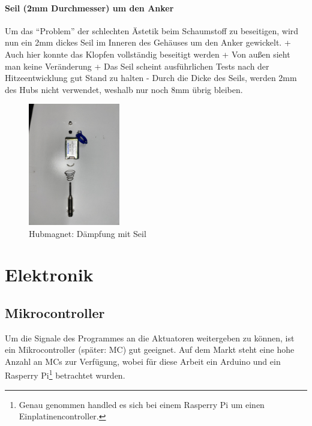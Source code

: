 \paragraph{Seil (2mm Durchmesser) um den Anker}

Um das \enquote{Problem} der schlechten Ästetik beim Schaumstoff zu beseitigen, wird nun ein 2mm dickes Seil im Inneren des Gehäuses um den Anker gewickelt. \newline
+ Auch hier konnte das Klopfen vollständig beseitigt werden \newline
+ Von außen sieht man keine Veränderung \newline
+ Das Seil scheint ausführlichen Tests nach der Hitzeentwicklung gut Stand zu halten  \newline
- Durch die Dicke des Seils, werden 2mm des Hubs nicht verwendet, weshalb nur noch 8mm übrig bleiben.

\begin{figure}[htbp]
	\centering
	\includegraphics [width=4cm] {img/Hubmagnet_Seil_Daempfung.jpg}
	\caption{Hubmagnet: Dämpfung mit Seil}
\end{figure}



\section{Elektronik}\label{konzeptionHW-elektronik}

\subsection{Mikrocontroller}\label{Ansteuerung}
Um die Signale des Programmes an die Aktuatoren weitergeben zu können, ist ein Mikrocontroller (später: \ac{MC}) gut geeignet.
Auf dem Markt steht eine hohe Anzahl an \ac{MC}s zur Verfügung,
wobei für diese Arbeit ein Arduino und ein Rasperry Pi\footnote{Genau genommen handled es sich bei einem Rasperry Pi um einen Einplatinencontroller.} betrachtet wurden.

